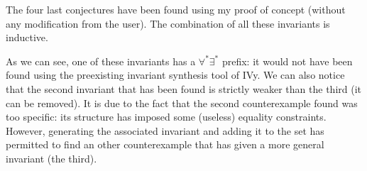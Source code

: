 \documentclass[11pt,a4paper,oldfontcommands,openany]{memoir}
\begin{document}
    The four last conjectures have been found using my proof of concept (without any modification from the user).
    The combination of all these invariants is inductive.

    As we can see, one of these invariants has a \(\forall^*\exists^*\) prefix: it would not have been found using the preexisting invariant synthesis tool of IVy.
    We can also notice that the second invariant that has been found is strictly weaker than the third (it can be removed).
    It is due to the fact that the second counterexample found was too specific: its structure has imposed some (useless) equality constraints.
    However, generating the associated invariant and adding it to the set has permitted to find an other counterexample that has given a more general invariant (the third).
\end{document}
